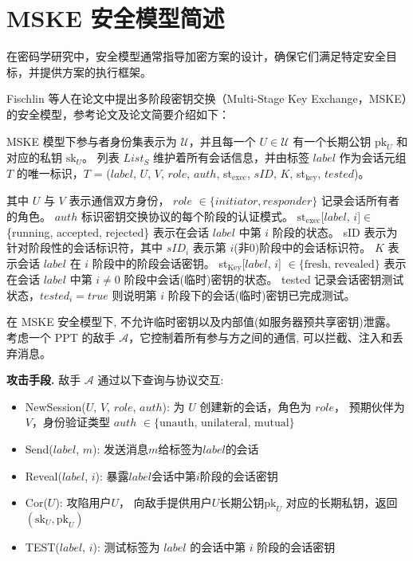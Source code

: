 \section{MSKE 安全模型简述}

在密码学研究中，安全模型通常指导加密方案的设计，确保它们满足特定安全目标，并提供方案的执行框架。

Fischlin 等人在论文\cite{fischlin_multi-stage_2014}中提出多阶段密钥交换（Multi-Stage Key Exchange，MSKE）的安全模型，参考论文\cite{ideal_lattice_2023}及论文\cite{timke_2024}简要介绍如下：

MSKE 模型下参与者身份集表示为 $\mathcal{U}$，并且每一个 $U\in \mathcal{U}$ 有一个长期公钥 $\mathrm{pk}_{U}$ 和对应的私钥 $\mathrm{sk}_{U}$。 列表 $List_S$ 维护着所有会话信息，并由标签 $label$ 作为会话元组 $T$ 的唯一标识，$T$ = ($label$, $U$, $V$, $role$, $auth$, st$_\text{exec}$, $sID$, $K$, st$_{\text {key}}$, $tested$)。

其中 $U$ 与 $V$ 表示通信双方身份，
$role$ $\in\{ initiator, responder \}$ 记录会话所有者的角色。 
$auth$ 标识密钥交换协议的每个阶段的认证模式。
$\mathrm{st}_{\text{exec}}$[$label$, $i$]$\in$ \{running, accepted, rejected\} 表示在会话 $label$ 中第 $i$ 阶段的状态。 
sID 表示为针对阶段性的会话标识符，其中 $sID_i$ 表示第 $i$(非0)阶段中的会话标识符。
$K$ 表示会话 $label$ 在 $i$ 阶段中的阶段会话密钥。 
st$_\text{Key}$[$label$, $i$] $\in\{\text {fresh, revealed}\}$ 表示在会话 $label$ 中第 $i \neq 0 $ 阶段中会话(临时)密钥的状态。 
tested 记录会话密钥测试状态，$tested_i = true$ 则说明第 $i$ 阶段下的会话(临时)密钥已完成测试。

在 MSKE 安全模型下, 不允许临时密钥以及内部值(如服务器预共享密钥)泄露。 考虑一个 PPT 的敌手 $\mathcal{A}$，它控制着所有参与方之间的通信, 可以拦截、注入和丢弃消息。

\textbf{攻击手段. }敌手 $\mathcal{A}$ 通过以下查询与协议交互: 

\begin{itemize}
\setlength\itemsep{-0.3em}
\item NewSession($U$, $V$, $role$, $auth$): 为 $U$ 创建新的会话，角色为 $role$， 预期伙伴为$V$，身份验证类型 $auth$ $\in \{\text{unauth, unilateral, mutual}\}$
\item Send($label$, $m$): 发送消息$m$给标签为$label$的会话
\item Reveal($label$, $i$): 暴露$label$会话中第$i$阶段的会话密钥
\item Cor($U$): 攻陷用户$U$， 向敌手提供用户$U$长期公钥$\mathrm{pk}_{U}$ 对应的长期私钥，返回$\left(\mathrm{sk}_{U}, \mathrm{pk}_{U}\right)$
\item TEST($label$, $i$): 测试标签为 $label$ 的会话中第 $i$ 阶段的会话密钥
\end{itemize}